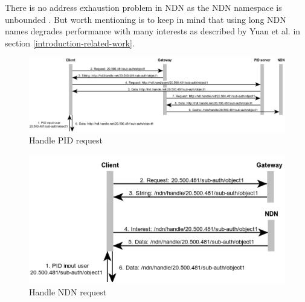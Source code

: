 There is no address exhaustion problem in NDN as the NDN namespace is unbounded \cite{ndn-nspace}. But worth mentioning is to keep in mind that using long NDN names degrades performance with many interests as described by Yuan et al. \cite{yuan2012scalable} in section \ref{introduction-related-work}.

\begin{figure}[H]
    \centering
    \includegraphics[width=\textwidth]{Images/pid_seq5.png}
    \caption{Handle PID request\label{fig:seq_pid}}
\end{figure}

\begin{figure}[H]
\includegraphics[scale=0.75]{Images/ndn_req.png}
\caption{Handle NDN request}
\label{fig:seq_ndn}
\end{figure}


